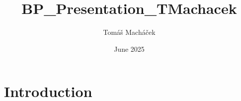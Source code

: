 \documentclass{article}
\title{BP_Presentation_TMachacek}
\author{Tomáš Macháček}
\date{June 2025}
\begin{document}
\maketitle

\section{Introduction}
\end{document}
